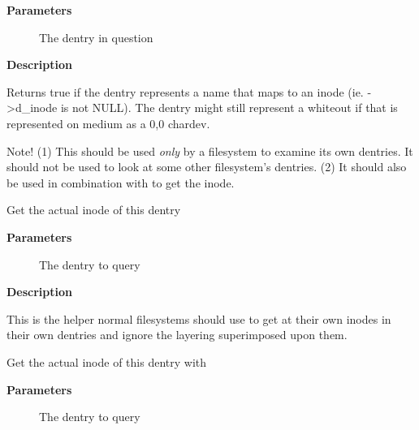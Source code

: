 \documentclass[a4paper,8pt,english]{sphinxmanual}
\begin{document}
\textbf{Parameters}
\begin{description}
\item[{}] \leavevmode
The dentry in question

\end{description}

\textbf{Description}

Returns true if the dentry represents a name that maps to an inode
(ie. -\textgreater{}d\_inode is not NULL).  The dentry might still represent a whiteout if
that is represented on medium as a 0,0 chardev.

Note!  (1) This should be used \emph{only} by a filesystem to examine its own
dentries.  It should not be used to look at some other filesystem's
dentries.  (2) It should also be used in combination with {\hyperref[filesystems/index:c.d_inode]{\emph{}}} to get
the inode.

\begin{fulllineitems}
\label{filesystems/index:c.d_inode}
Get the actual inode of this dentry

\end{fulllineitems}


\textbf{Parameters}
\begin{description}
\item[{}] \leavevmode
The dentry to query

\end{description}

\textbf{Description}

This is the helper normal filesystems should use to get at their own inodes
in their own dentries and ignore the layering superimposed upon them.

\begin{fulllineitems}
\label{filesystems/index:c.d_inode_rcu}
Get the actual inode of this dentry with 

\end{fulllineitems}


\textbf{Parameters}
\begin{description}
\item[{}] \leavevmode
The dentry to query

\end{description}
\end{document}
